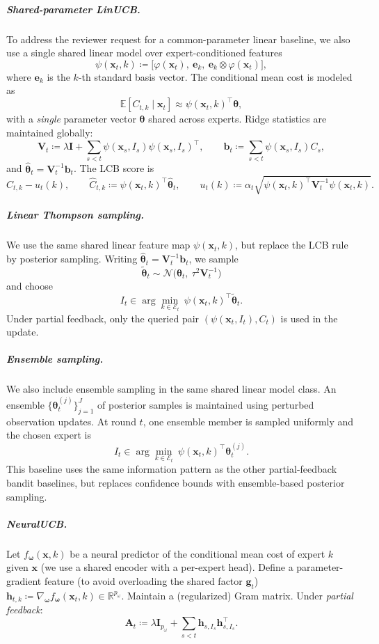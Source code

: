 \subparagraph{Shared-parameter LinUCB.}
To address the reviewer request for a common-parameter linear baseline, we also use a single shared
linear model over expert-conditioned features
\[
\psi(\mathbf{x}_t,k)\coloneqq
\big[\varphi(\mathbf{x}_t),\ \mathbf{e}_k,\ \mathbf{e}_k\otimes \varphi(\mathbf{x}_t)\big],
\]
where \(\mathbf{e}_k\) is the \(k\)-th standard basis vector. The conditional mean cost is modeled as
\[
\mathbb{E}[C_{t,k}\mid \mathbf{x}_t]\approx \psi(\mathbf{x}_t,k)^\top\boldsymbol{\theta},
\]
with a \emph{single} parameter vector \(\boldsymbol{\theta}\) shared across experts. Ridge statistics are
maintained globally:
\[
\mathbf{V}_t\coloneqq \lambda \mathbf{I} + \sum_{s<t}\psi(\mathbf{x}_s,I_s)\psi(\mathbf{x}_s,I_s)^\top,
\qquad
\mathbf{b}_t\coloneqq \sum_{s<t}\psi(\mathbf{x}_s,I_s)C_s,
\]
and \(\widehat{\boldsymbol{\theta}}_t=\mathbf{V}_t^{-1}\mathbf{b}_t\). The LCB score is
\[
\widehat{C}_{t,k}-u_t(k), \qquad
\widehat{C}_{t,k}\coloneqq \psi(\mathbf{x}_t,k)^\top\widehat{\boldsymbol{\theta}}_t,\qquad
u_t(k)\coloneqq \alpha_t\sqrt{\psi(\mathbf{x}_t,k)^\top\mathbf{V}_t^{-1}\psi(\mathbf{x}_t,k)}.
\]

\subparagraph{Linear Thompson sampling.}
We use the same shared linear feature map \(\psi(\mathbf{x}_t,k)\), but replace the LCB rule by posterior
sampling. Writing \(\widehat{\boldsymbol{\theta}}_t=\mathbf{V}_t^{-1}\mathbf{b}_t\), we sample
\[
\widetilde{\boldsymbol{\theta}}_t \sim
\mathcal{N}\!\big(\widehat{\boldsymbol{\theta}}_t,\ \tau^2\mathbf{V}_t^{-1}\big)
\]
and choose
\[
I_t \in \arg\min_{k\in\mathcal{E}_t}\ \psi(\mathbf{x}_t,k)^\top \widetilde{\boldsymbol{\theta}}_t.
\]
Under partial feedback, only the queried pair \((\psi(\mathbf{x}_t,I_t),C_t)\) is used in the update.

\subparagraph{Ensemble sampling.}
We also include ensemble sampling \citep{lu2017ensemble} in the same shared linear model class. An
ensemble \(\{\boldsymbol{\theta}^{(j)}_t\}_{j=1}^J\) of posterior samples is maintained using perturbed
observation updates. At round \(t\), one ensemble member is sampled uniformly and the chosen expert is
\[
I_t \in \arg\min_{k\in\mathcal{E}_t}\ \psi(\mathbf{x}_t,k)^\top \boldsymbol{\theta}^{(j)}_t.
\]
This baseline uses the same information pattern as the other partial-feedback bandit baselines, but
replaces confidence bounds with ensemble-based posterior sampling.

\subparagraph{NeuralUCB.}
Let \(f_{\boldsymbol{\omega}}(\mathbf{x},k)\) be a neural predictor of the conditional mean cost of expert
\(k\) given \(\mathbf{x}\) (we use a shared encoder with a per-expert head).
Define a parameter-gradient feature (to avoid overloading the shared factor \(\mathbf{g}_t\))
\(
\mathbf{h}_{t,k}\coloneqq \nabla_{\boldsymbol{\omega}} f_{\boldsymbol{\omega}}(\mathbf{x}_t,k)\in\mathbb{R}^{p_\omega}.
\)
Maintain a (regularized) Gram matrix. Under \emph{partial feedback}:
\[
\mathbf{A}_t\coloneqq \lambda \mathbf{I}_{p_\omega}
+
\sum_{s<t} \mathbf{h}_{s,I_s}\mathbf{h}_{s,I_s}^\top.
\]

